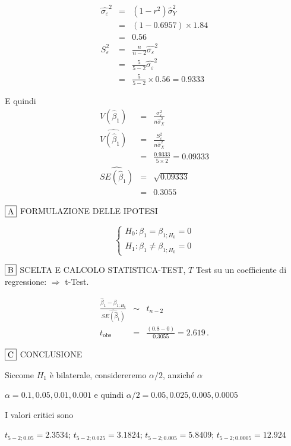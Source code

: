 \documentclass[
  11pt,
]{book}
\theoremstyle{mytheoremstyle}
\theoremstyle{mydefstyle}
\newenvironment{sol}
  {
  \begin{tcolorbox}[enhanced,breakable,arc=0.1mm,boxrule=1pt,colback=white,colframe=iblue,
  title=\bf \fontfamily{lmss}\selectfont \hspace{.5 cm} Soluzione,drop fuzzy shadow]

}{
\end{tcolorbox}
  }
\begin{document}
\begin{sol}
\begin{eqnarray*}
\hat{\sigma_\varepsilon}^2&=&(1-r^2)\hat\sigma_Y^2\\
&=& (1- 0.6957 )\times 1.84 \\
   &=&  0.56 \\
   S_\varepsilon^2 &=& \frac{n} {n-2} \hat{\sigma_\varepsilon}^2\\
   &=&  \frac{ 5 } { 5 -2} \hat{\sigma_\varepsilon}^2 \\
 &=&  \frac{ 5 } { 5 -2} \times  0.56  =  0.9333  
\end{eqnarray*}

E quindi\begin{eqnarray*}
V(\hat\beta_{1}) &=& \frac{\sigma_{\varepsilon}^{2}} {n \hat{\sigma}^{2}_{X}} \\
\widehat{V(\hat\beta_{1})} &=& \frac{S_{\varepsilon}^{2}} {n \hat{\sigma}^{2}_{X}} \\
 &=& \frac{ 0.9333 } { 5 \times  2 } =  0.09333 \\
 \widehat{SE(\hat\beta_{1})}        &=&  \sqrt{ 0.09333 }\\
 &=&  0.3055 
\end{eqnarray*}

\(\fbox{A}\) FORMULAZIONE DELLE IPOTESI

\[\begin{cases}
   H_0: \beta_1 = \beta_{1;H_0}=0 \\
   H_1: \beta_1 \neq \beta_{1;H_0}=0 
   \end{cases}\]

\(\fbox{B}\) SCELTA E CALCOLO STATISTICA-TEST, \(T\)
Test su un coefficiente di regressione: \(\Rightarrow\) t-Test.

\begin{eqnarray*}
 \frac{\hat\beta_{ 1 } - \beta_{ 1 ;H_0}} {\widehat{SE(\hat\beta_{ 1 })}}&\sim&t_{n-2}\\
   t_{\text{obs}}
&=& \frac{ ( 0.8 -  0 )} { 0.3055 }
 =   2.619 \, .
\end{eqnarray*}

\(\fbox{C}\) CONCLUSIONE

Siccome \(H_1\) è bilaterale, considereremo \(\alpha/2\),
anziché \(\alpha\)

\(\alpha=0.1, 0.05, 0.01, 0.001\) e quindi \(\alpha/2=0.05, 0.025, 0.005, 0.0005\)

I valori critici sono

\(t_{5-2;0.05}=2.3534\); \(t_{5-2;0.025}=3.1824\); \(t_{5-2;0.005}=5.8409\); \(t_{5-2;0.0005}=12.924\)


\end{sol}
\end{document}
